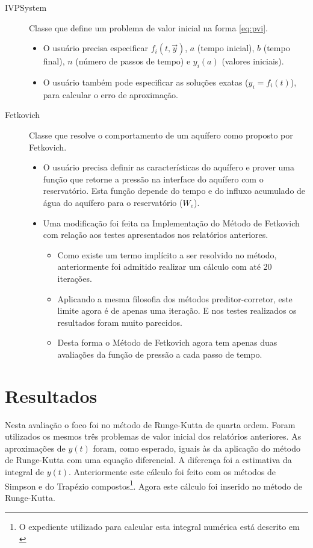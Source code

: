 \documentclass[final,5p]{elsarticle}
\numberwithin{equation}{section}
\begin{document}
        \begin{description}
            \item[IVPSystem] Classe que define um problema de valor inicial na forma \ref{eq:pvi}.
            \begin{itemize}
                \item O usuário precisa especificar $f_i(t,\overrightarrow{y})$, $a$ (tempo inicial), $b$ (tempo final), $n$ (número de passos de tempo) e $y_i(a)$ (valores iniciais).
                \item O usuário também pode especificar as soluções exatas ($y_i=f_i(t)$), para calcular o erro de aproximação.
            \end{itemize}
            \item[Fetkovich] Classe que resolve o comportamento de um aquífero como proposto por Fetkovich.
            \begin{itemize}
                \item O usuário precisa definir as características do aquífero e prover uma função que retorne a pressão na interface do aquífero com o reservatório. Esta função depende do tempo e do influxo acumulado de água do aquífero para o reservatório ($W_e$).
                \item Uma modificação foi feita na Implementação do Método de Fetkovich com relação aos testes apresentados nos relatórios anteriores.
                \begin{itemize}
                    \item Como existe um termo implícito a ser resolvido no método, anteriormente foi admitido realizar um cálculo com até 20 iterações.
                    \item Aplicando a mesma filosofia dos métodos preditor-corretor, este limite agora é de apenas uma iteração. E nos testes realizados os resultados foram muito parecidos.
                    \item Desta forma o Método de Fetkovich agora tem apenas duas avaliações da função de pressão a cada passo de tempo.
                \end{itemize}
            \end{itemize}
        \end{description}

\section{Resultados}

        Nesta avaliação o foco foi no método de Runge-Kutta de quarta ordem. Foram utilizados os mesmos três problemas de valor inicial dos relatórios anteriores. As aproximações de $y(t)$ foram, como esperado, iguais às da aplicação do método de Runge-Kutta com uma equação diferencial. A diferença foi a estimativa da integral de $y(t)$. Anteriormente este cálculo foi feito com os métodos de Simpson e do Trapézio compostos\footnote{O expediente utilizado para calcular esta integral numérica está descrito em \cite{relatoriorungekutta}}. Agora este cálculo foi inserido no método de Runge-Kutta.
\end{document}
